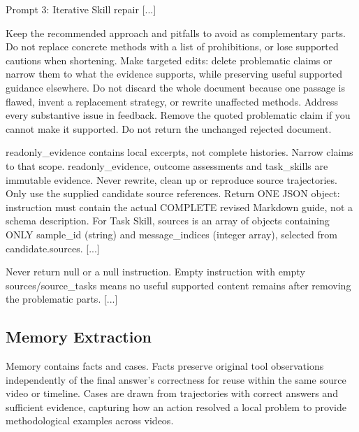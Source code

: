 \begin{AppendixPrompt}{Prompt 3: Iterative Skill repair}
[...]

Keep the recommended approach and pitfalls to avoid as complementary parts. Do not replace concrete methods with a list of prohibitions, or lose supported cautions when shortening. Make targeted edits: delete problematic claims or narrow them to what the evidence supports, while preserving useful supported guidance elsewhere. Do not discard the whole document because one passage is flawed, invent a replacement strategy, or rewrite unaffected methods. Address every substantive issue in feedback. Remove the quoted problematic claim if you cannot make it supported. Do not return the unchanged rejected document.

readonly\_evidence contains local excerpts, not complete histories. Narrow claims to that scope. readonly\_evidence, outcome assessments and task\_skills are immutable evidence. Never rewrite, clean up or reproduce source trajectories. Only use the supplied candidate source references. Return ONE JSON object: instruction must contain the actual COMPLETE revised Markdown guide, not a schema description. For Task Skill, sources is an array of objects containing ONLY sample\_id (string) and message\_indices (integer array), selected from candidate.sources. [...]

Never return null or a null instruction. Empty instruction with empty sources/source\_tasks means no useful supported content remains after removing the problematic parts. [...]
\end{AppendixPrompt}

\subsection{Memory Extraction}

Memory contains facts and cases. Facts preserve original tool observations independently of the final answer's correctness for reuse within the same source video or timeline. Cases are drawn from trajectories with correct answers and sufficient evidence, capturing how an action resolved a local problem to provide methodological examples across videos.

